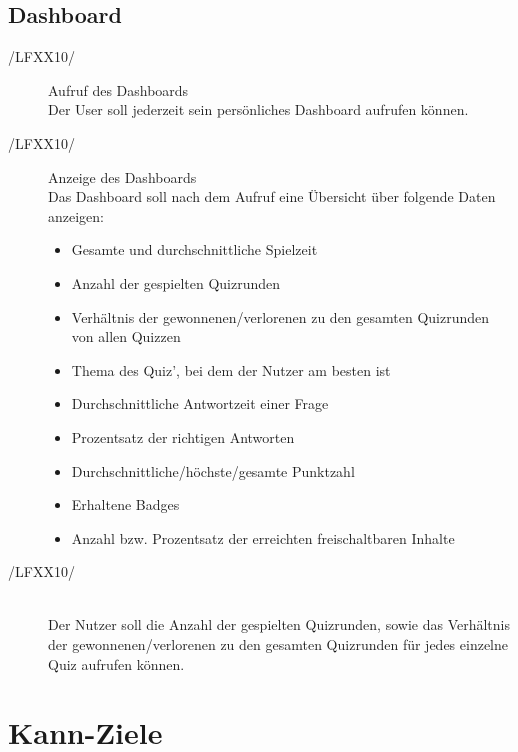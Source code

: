 \documentclass[11pt,a4paper]{scrreprt}
\begin{document}
\subsection{Dashboard}
\begin{description}
\item[/LFXX10/] Aufruf des Dashboards \\
Der User soll jederzeit sein persönliches Dashboard aufrufen können.

\item[/LFXX10/] Anzeige des Dashboards  \\
Das Dashboard soll nach dem Aufruf eine Übersicht über folgende Daten anzeigen:
\begin{itemize}
	\item Gesamte und durchschnittliche Spielzeit
	\item Anzahl der gespielten Quizrunden
	\item Verhältnis der gewonnenen/verlorenen zu den gesamten Quizrunden von allen Quizzen
	\item Thema des Quiz', bei dem der Nutzer am besten ist
	\item Durchschnittliche Antwortzeit einer Frage
	\item Prozentsatz der richtigen Antworten
	\item Durchschnittliche/höchste/gesamte Punktzahl
	\item Erhaltene Badges
	\item Anzahl bzw. Prozentsatz der erreichten freischaltbaren Inhalte
\end{itemize}

\item[/LFXX10/]\ \\
Der Nutzer soll die Anzahl der gespielten Quizrunden, sowie das Verhältnis der gewonnenen/verlorenen zu den gesamten Quizrunden für jedes einzelne Quiz aufrufen können.
\end{description}
	
\section{Kann-Ziele}
\end{document}
